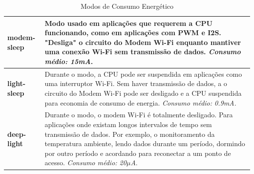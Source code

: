 \documentclass[
12pt,				%
openany,			%
twoside,			%
a4paper,			%
english,			%
french,				%
spanish,			%
brazil,				%
]{abntex2}
\begin{document}
\vspace{10pt}

\begin{table}[!ht]
    \centering
    \footnotesize{
        \label{Modos-Energia}
        \caption{Modos de Consumo Energético}
        \begin{tabular}{>{\bfseries}lp{5.35cm}}
            \toprule
            modem-sleep & Modo usado em aplicações que requerem a CPU funcionando, como em aplicações com PWM e I2S. "Desliga" o circuito do Modem Wi-Fi enquanto mantiver uma conexão Wi-Fi sem transmissão de dados. \emph{Consumo médio: 15mA}. \\\midrule
            light-sleep & Durante o modo, a CPU pode ser suspendida em aplicações como uma interruptor Wi-Fi. Sem haver transmissão de dados, a o circuito do Modem Wi-Fi pode ser desligado e a CPU suspendida para economia de consumo de energia. \emph{Consumo médio: 0.9mA.} \\\midrule
            deep-light & Durante o modo, o modem Wi-Fi é totalmente desligado. Para aplicações onde existam longos intervalos de tempo sem transmissão de dados. Por exemplo, o monitoramento da temperatura ambiente, lendo dados durante um período, dormindo por outro período e acordando para reconectar a um ponto de acesso. \emph{Consumo médio: 20$\mu$A}. \\\bottomrule
        \end{tabular}
    }
\end{table}
\end{document}
